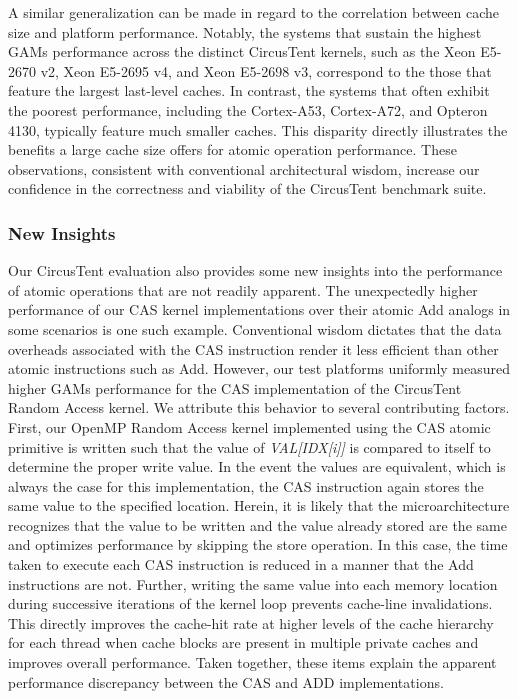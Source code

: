 A similar generalization can be made in regard to the correlation between cache size and platform performance.
Notably, the systems that sustain the highest GAMs performance across the distinct CircusTent kernels, such as the Xeon E5-2670 v2, Xeon E5-2695 v4, and Xeon E5-2698 v3, correspond to the those that feature the largest last-level caches.
In contrast, the systems that often exhibit the poorest performance, including the Cortex-A53, Cortex-A72, and Opteron 4130, typically feature much smaller caches.
This disparity directly illustrates the benefits a large cache size offers for atomic operation performance.
These observations, consistent with conventional architectural wisdom, increase our confidence in the correctness and viability of the CircusTent benchmark suite.

\subsubsection{New Insights}
\label{subsubsec:new_insights}

Our CircusTent evaluation also provides some new insights into the performance of atomic operations that are not readily apparent.
The unexpectedly higher performance of our CAS kernel implementations over their atomic Add analogs in some scenarios is one such example.
Conventional wisdom dictates that the data overheads associated with the CAS instruction render it less efficient than other atomic instructions such as Add.
However, our test platforms uniformly measured higher GAMs performance for the CAS implementation of the CircusTent Random Access kernel.
We attribute this behavior to several contributing factors.
First, our OpenMP Random Access kernel implemented using the CAS atomic primitive is written such that the value of \textit{VAL[IDX[i]]} is compared to itself to determine the proper write value.
In the event the values are equivalent, which is always the case for this implementation, the CAS instruction again stores the same value to the specified location.
Herein, it is likely that the microarchitecture recognizes that the value to be written and the value already stored are the same and optimizes performance by skipping the store operation.
In this case, the time taken to execute each CAS instruction is reduced in a manner that the Add instructions are not.
Further, writing the same value into each memory location during successive iterations of the kernel loop prevents cache-line invalidations.
This directly improves the cache-hit rate at higher levels of the cache hierarchy for each thread when cache blocks are present in multiple private caches and improves overall performance.
Taken together, these items explain the apparent performance discrepancy between the CAS and ADD implementations.

